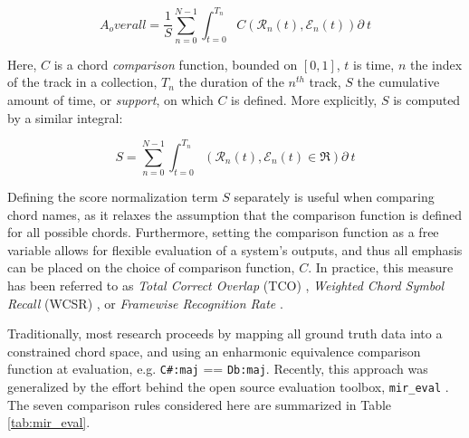 \begin{equation}
\label{eq:recall_micro}
A_overall = \frac{1}{S}\sum_{n=0}^{N-1}\int_{t=0}^{T_n}C(\mathcal{R}_n(t), \mathcal{E}_n(t))\partial~t
\end{equation}

\noindent Here, $C$ is a chord \emph{comparison} function, bounded on $[0, 1]$, $t$ is time, $n$ the index of the track in a collection, $T_n$ the duration of the $n^{th}$ track, $S$ the cumulative amount of time, or \emph{support}, on which $C$ is defined.
More explicitly, $S$ is computed by a similar integral:

\begin{equation}
S = \sum_{n=0}^{N-1}\int_{t=0}^{T_n}(\mathcal{R}_n(t), \mathcal{E}_n(t) \in \Re)\partial~t
\end{equation}

Defining the score normalization term $S$ separately is useful when comparing chord names, as it relaxes the assumption that the comparison function is defined for all possible chords.
Furthermore, setting the comparison function as a free variable allows for flexible evaluation of a system's outputs, and thus all emphasis can be placed on the choice of comparison function, $C$.
In practice, this measure has been referred to as \emph{Total Correct Overlap} (TCO) \cite{Mauch, Harte, McVicar}, \emph{Weighted Chord Symbol Recall} (WCSR) \cite{MIReX}, or \emph{Framewise Recognition Rate} \cite{Cho2014}.

Traditionally, most research proceeds by mapping all ground truth data into a constrained chord space, and using an enharmonic equivalence comparison function at evaluation, e.g. \texttt{C\#:maj} == \texttt{Db:maj}.
Recently, this approach was generalized by the effort behind the open source evaluation toolbox, \texttt{mir\_eval} \cite{Raffel2014}.
The seven comparison rules considered here are summarized in Table \ref{tab:mir_eval}.

